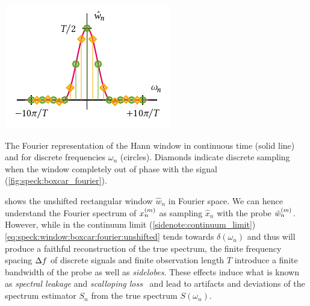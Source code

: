 \begin{marginfigure}
    \centering
    \includegraphics{img/pdf/spectrometer/hann}
    \caption[]{
        The Fourier representation of the Hann window in continuous time (solid line) and for discrete frequencies $\omega_n$ (circles).
        Diamonds indicate discrete sampling when the window completely out of phase with the signal (\cf \cref{fig:speck:boxcar_fourier}).
    }
    \label{fig:speck:hann_fourier}
\end{marginfigure}
 shows the unshifted rectangular window $\hat{w}_n$ in Fourier space.
We can hence understand the Fourier spectrum of $x_n^{(m)}$ as sampling $\hat{x}_n$ with the probe $\hat{w}_n^{(m)}$.
However, while in the continuum limit (\cref{sidenote:continuum_limit}) \cref{eq:speck:window:boxcar:fourier:unshifted} tends towards $\delta(\omega_n)$ and thus will produce a faithful reconstruction of the true spectrum, the finite frequency spacing $\Delta f$ of discrete signals and finite observation length $T$ introduce a finite bandwidth of the probe as well as \emph{sidelobes}.
These effects induce what is known as \emph{spectral leakage} and \emph{scalloping loss}~\cite{Harris1978,Koopmans1995} and lead to artifacts and deviations of the spectrum estimator $S_n$ from the true spectrum $S(\omega_n)$.

